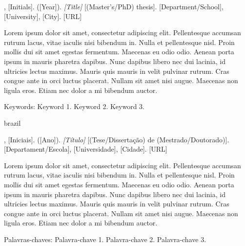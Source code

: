 
\setlength{\absparsep}{18pt}
\begin{resumo}

\begin{flushleft}
[Surname], [Initials]. ([Year]). \textit{[Title]} [(Master's/PhD) thesis]. [Department/School], [University], [City]. [URL]
\end{flushleft}

Lorem ipsum dolor sit amet, consectetur adipiscing elit. Pellentesque accumsan rutrum lacus, vitae iaculis nisi bibendum in. Nulla et pellentesque nisl. Proin mollis dui sit amet egestas fermentum. Maecenas eu odio odio. Aenean porta ipsum in mauris pharetra dapibus. Nunc dapibus libero nec dui lacinia, id ultricies lectus maximus. Mauris quis mauris in velit pulvinar rutrum. Cras congue ante in orci luctus placerat. Nullam sit amet nisi augue. Maecenas non ligula eros. Etiam nec dolor a mi bibendum auctor.

Keywords: Keyword 1. Keyword 2. Keyword 3.
\end{resumo}


\begin{resumo}[RESUMO]
\begin{otherlanguage*}{brazil}

\begin{flushleft}
[Sobrenome], [Iniciais]. ([Ano]). \textit{[Título]} [(Tese/Dissertação) de (Mestrado/Doutorado)]. [Departament/Escola], [Universidade], [Cidade]. [URL]
\end{flushleft}

Lorem ipsum dolor sit amet, consectetur adipiscing elit. Pellentesque accumsan rutrum lacus, vitae iaculis nisi bibendum in. Nulla et pellentesque nisl. Proin mollis dui sit amet egestas fermentum. Maecenas eu odio odio. Aenean porta ipsum in mauris pharetra dapibus. Nunc dapibus libero nec dui lacinia, id ultricies lectus maximus. Mauris quis mauris in velit pulvinar rutrum. Cras congue ante in orci luctus placerat. Nullam sit amet nisi augue. Maecenas non ligula eros. Etiam nec dolor a mi bibendum auctor.

Palavras-chaves: Palavra-chave 1. Palavra-chave 2. Palavra-chave 3.
\end{otherlanguage*}
\end{resumo}

